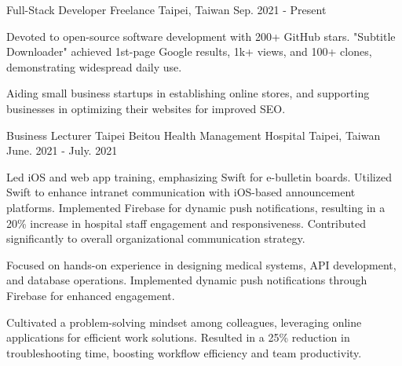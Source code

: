 

\begin{cventries}

  \cventry
    {Full-Stack Developer} %
    {Freelance} %
    {Taipei, Taiwan} %
    {Sep. 2021 - Present} %
    {
      \begin{cvitems} %
        \item {Devoted to open-source software development with 200+ GitHub stars. "Subtitle Downloader" achieved 1st-page Google results, 1k+ views, and 100+ clones, demonstrating widespread daily use.}
        \item {Aiding small business startups in establishing online stores, and supporting businesses in optimizing their websites for improved SEO.}
      \end{cvitems}
    }

  \cventry
  {Business Lecturer} %
  {Taipei Beitou Health Management Hospital} %
  {Taipei, Taiwan} %
  {June. 2021 - July. 2021} %
  {
    \begin{cvitems} %
      \item {Led iOS and web app training, emphasizing Swift for e-bulletin boards. Utilized Swift to enhance intranet communication with iOS-based announcement platforms. Implemented Firebase for dynamic push notifications, resulting in a 20\% increase in hospital staff engagement and responsiveness. Contributed significantly to overall organizational communication strategy.}
      \item {Focused on hands-on experience in designing medical systems, API development, and database operations. Implemented dynamic push notifications through Firebase for enhanced engagement.}
      \item {Cultivated a problem-solving mindset among colleagues, leveraging online applications for efficient work solutions. Resulted in a 25\% reduction in troubleshooting time, boosting workflow efficiency and team productivity.}
    \end{cvitems}
  }


\end{cventries}
